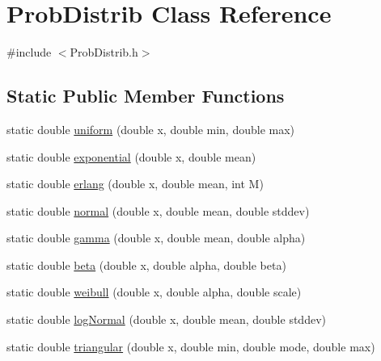 \hypertarget{class_prob_distrib}{\section{Prob\-Distrib Class Reference}
\label{class_prob_distrib}
}


{\ttfamily \#include $<$Prob\-Distrib.\-h$>$}

\subsection*{Static Public Member Functions}
\begin{DoxyCompactItemize}
\item 
static double \hyperlink{class_prob_distrib_a4ff9f4d4faa1c29eb970c2629b332032}{uniform} (double x, double min, double max)
\item 
static double \hyperlink{class_prob_distrib_ad638ee57a1ad9ffe4a81e6f7607736a2}{exponential} (double x, double mean)
\item 
static double \hyperlink{class_prob_distrib_a479f7cbaef301482e924d57627675796}{erlang} (double x, double mean, int M)
\item 
static double \hyperlink{class_prob_distrib_a5ca4ebda2818070339b707a880e3d1a4}{normal} (double x, double mean, double stddev)
\item 
static double \hyperlink{class_prob_distrib_a2a5a2f10a9ba6475591597643b555ab9}{gamma} (double x, double mean, double alpha)
\item 
static double \hyperlink{class_prob_distrib_af74e5c70a59727220d52a7f445992b28}{beta} (double x, double alpha, double beta)
\item 
static double \hyperlink{class_prob_distrib_a74aadd83aaa5459d3a9dd534f6dce82a}{weibull} (double x, double alpha, double scale)
\item 
static double \hyperlink{class_prob_distrib_ad6e3ae223763aae5c2fe7d347523adbb}{log\-Normal} (double x, double mean, double stddev)
\item 
static double \hyperlink{class_prob_distrib_a057f5c5a97ab296f60b1a92ec1886162}{triangular} (double x, double min, double mode, double max)
\end{DoxyCompactItemize}


